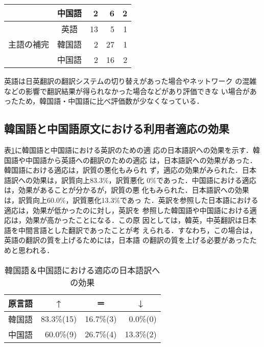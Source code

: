 \begin{table}[htbp]
\begin {center}
\begin{tabular}{|c|c|r|r|r|}
\cline{2-5}
                   & 中国語 &  2 &  6 &  2 \\
\hline 
                   & 英語   & 13 &  5 &  1 \\
\cline{2-5}
主語の補完         & 韓国語 &  2 & 27 &  1 \\
\cline{2-5}
                   & 中国語 &  2 & 16 &  2 \\
\hline 
\end{tabular}
\end{center}
    \footnotesize
      {英語は日英翻訳の翻訳システムの切り替えがあった場合やネットワーク
       の混雑などの影響で翻訳結果が得られなかった場合などがあり評価できな
       い場合があったため，韓国語・中国語に比べ評価数が少なくなっている．} 
\end{table}

\subsection{韓国語と中国語原文における利用者適応の効果}

表\ref{Table:Effect_to_Japanese}に韓国語と中国語における英訳のための適
応の日本語訳への効果を示す．韓国語や中国語から英語への翻訳のための適応
は，日本語訳への効果があった．韓国語における適応は，訳質の悪化もみられ
ず，適応の効果がみられた．日本語訳への効果は，訳質向上83.3\%，訳質悪化
0\%であった．中国語における適応は，効果があることが分かるが，訳質の悪
化もみられた．日本語訳への効果は，訳質向上60.0\%，訳質悪化13.3\%であっ
た．英訳を参照した日本語における適応は，効果が低かったのに対し，英訳を
参照した韓国語や中国語における適応は，効果が高かったことになる．この原
因としては，韓英，中英翻訳は日本語を中間言語とした翻訳であったことが考
えられる．すなわち，この場合は，英語の翻訳の質を上げるためには，日本語
の翻訳の質を上げる必要があったためと思われる．

\begin{table}[htbp]
    \leavevmode
\small
    \caption{韓国語＆中国語における適応の日本語訳への効果}
    \label{Table:Effect_to_Japanese}
    \vspace*{-3mm}
\begin {center}
\begin{tabular}{|c|r|r|r|}
\hline
\multicolumn{1}{|c|}{\bf 原言語} & 
\multicolumn{1}{c|}{\bf ↑} & 
\multicolumn{1}{c|}{\bf ＝} & 
\multicolumn{1}{c|}{\bf ↓}  \\
\hline
韓国語 & 83.3\%(15) & 16.7\%(3) &  0.0\%(0) \\
\hline
中国語 &  60.0\%(9) & 26.7\%(4) & 13.3\%(2) \\
\hline 
\end{tabular}
\end{center}
\end{table}

